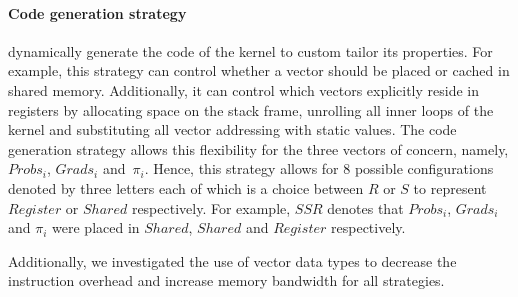 \paragraph*{\textbf{Code generation strategy}} dynamically generate the code of the kernel to
custom tailor its properties. For example, this strategy can control whether a
vector should be placed or cached in shared memory. Additionally, it can
control which vectors explicitly reside in registers by allocating space on the
stack frame, unrolling all inner loops of the kernel and substituting all
vector addressing with static values. The code generation strategy allows this
flexibility for the three vectors of concern, namely, $Probs_i$, $Grads_i$
and~$\pi_i$.
Hence, this strategy allows for 8 possible configurations denoted by
three letters each of which is a choice between $R$ or $S$ to represent
$Register$ or $Shared$ respectively. For example, $SSR$ denotes that $Probs_i$,
$Grads_i$ and $\pi_i$ were placed in $Shared$, $Shared$ and $Register$
respectively.

Additionally, we investigated the use of vector data types to decrease the
instruction overhead and increase memory bandwidth for all strategies.
